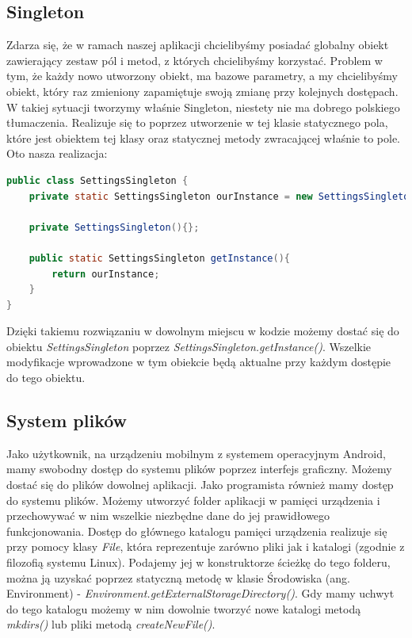 \subsection{Singleton}
Zdarza się, że w ramach naszej aplikacji chcielibyśmy posiadać globalny obiekt zawierający zestaw pól i metod, z których chcielibyśmy korzystać. Problem w tym, że każdy nowo utworzony obiekt, ma bazowe parametry, a my chcielibyśmy obiekt, który raz zmieniony zapamiętuje swoją zmianę przy kolejnych dostępach. W takiej sytuacji tworzymy właśnie Singleton, niestety nie ma dobrego polskiego tłumaczenia. Realizuje się to poprzez utworzenie w tej klasie statycznego pola, które jest obiektem tej klasy oraz statycznej metody zwracającej właśnie to pole. Oto nasza realizacja:
\begin{lstlisting}[language=Java]
public class SettingsSingleton {
    private static SettingsSingleton ourInstance = new SettingsSingleton();
    
    private SettingsSingleton(){};
    
    public static SettingsSingleton getInstance(){
        return ourInstance;
    }
}
\end{lstlisting}
Dzięki takiemu rozwiązaniu w dowolnym miejscu w kodzie możemy dostać się do obiektu \textit{SettingsSingleton} poprzez \textit{SettingsSingleton.getInstance()}. Wszelkie modyfikacje wprowadzone w tym obiekcie będą aktualne przy każdym dostępie do tego obiektu.
\subsection{System plików}
Jako użytkownik, na urządzeniu mobilnym z systemem operacyjnym Android, mamy swobodny dostęp do systemu plików poprzez interfejs graficzny. Możemy dostać się do plików dowolnej aplikacji. Jako programista również mamy dostęp do systemu plików. Możemy utworzyć folder aplikacji w pamięci urządzenia i przechowywać w nim wszelkie niezbędne dane do jej prawidłowego funkcjonowania. Dostęp do głównego katalogu pamięci urządzenia realizuje się przy pomocy klasy \textit{File}, która reprezentuje zarówno pliki jak i katalogi (zgodnie z filozofią systemu Linux). Podajemy jej w konstruktorze ścieżkę do tego folderu, można ją uzyskać poprzez statyczną metodę w klasie Środowiska (ang. Environment) -  \textit{Environment.getExternalStorageDirectory()}. Gdy mamy uchwyt do tego katalogu możemy w nim dowolnie tworzyć nowe katalogi metodą \textit{mkdirs()} lub pliki metodą \textit{createNewFile()}.
